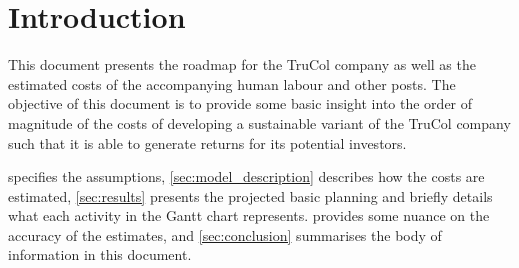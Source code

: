 \section{Introduction}\label{sec:intro}
This document presents the roadmap for the TruCol company as well as the estimated costs of the accompanying human labour and other posts. The objective of this document is to provide some basic insight into the order of magnitude of the costs of developing a sustainable variant of the TruCol company such that it is able to generate returns for its potential investors.

 specifies the assumptions, \cref{sec:model_description} describes how the costs are estimated, \cref{sec:results} presents the projected basic planning and briefly details what each activity in the Gantt chart represents.  provides some nuance on the accuracy of the estimates, and \cref{sec:conclusion} summarises the body of information in this document.
